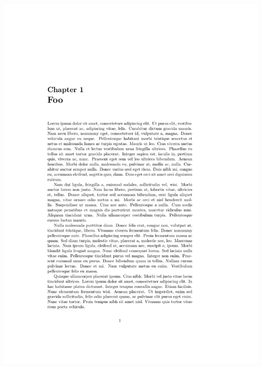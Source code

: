 \documentclass{beamer}
\begin{document}
\begin{frame}[fragile]
\begin{overprint}
\begin{columns}
      \begin{column}{0.5\textwidth}
        \begin{latexcode}
          \setlength\midchapskip{0pt}
        \end{latexcode}
        \begin{center}
          \includegraphics[frame,page=1,width=0.8\linewidth]{examples/afterchapternum-2}
        \end{center}
      \end{column}
    \end{columns}


\end{overprint}
\end{frame}
\end{document}
